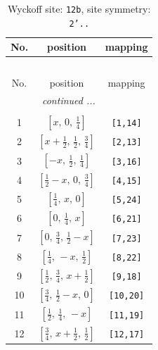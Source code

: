 \documentclass[fleqn,8pt]{jsarticle}
\begin{document}
\begin{longtable}{ccc}
\caption{Wyckoff site: {\tt 12b}, site symmetry: {\tt 2'..}}
 \\
 \hline \hline
No. & position & mapping \\ \hline \endfirsthead

\multicolumn{2}{l}{\tablename\ \thetable{}} \\
 \hline \hline
No. & position & mapping \\ \hline \endhead

 \hline \hline
\multicolumn{2}{r}{\footnotesize\it continued ...} \\ \endfoot

 \hline \hline
\multicolumn{2}{r}{} \\ \endlastfoot

1 & $\left[ x,\, 0,\, \frac{1}{4} \right]$ & {\tt [1,14]} \\ \hline
2 & $\left[ x + \frac{1}{2},\, \frac{1}{2},\, \frac{3}{4} \right]$ & {\tt [2,13]} \\ \hline
3 & $\left[ - x,\, \frac{1}{2},\, \frac{1}{4} \right]$ & {\tt [3,16]} \\ \hline
4 & $\left[ \frac{1}{2} - x,\, 0,\, \frac{3}{4} \right]$ & {\tt [4,15]} \\ \hline
5 & $\left[ \frac{1}{4},\, x,\, 0 \right]$ & {\tt [5,24]} \\ \hline
6 & $\left[ 0,\, \frac{1}{4},\, x \right]$ & {\tt [6,21]} \\ \hline
7 & $\left[ 0,\, \frac{3}{4},\, \frac{1}{2} - x \right]$ & {\tt [7,23]} \\ \hline
8 & $\left[ \frac{1}{4},\, - x,\, \frac{1}{2} \right]$ & {\tt [8,22]} \\ \hline
9 & $\left[ \frac{1}{2},\, \frac{3}{4},\, x + \frac{1}{2} \right]$ & {\tt [9,18]} \\ \hline
10 & $\left[ \frac{3}{4},\, \frac{1}{2} - x,\, 0 \right]$ & {\tt [10,20]} \\ \hline
11 & $\left[ \frac{1}{2},\, \frac{1}{4},\, - x \right]$ & {\tt [11,19]} \\ \hline
12 & $\left[ \frac{3}{4},\, x + \frac{1}{2},\, \frac{1}{2} \right]$ & {\tt [12,17]} \\
\end{longtable}
\renewcommand{\arraystretch}{1.2}
\end{document}
